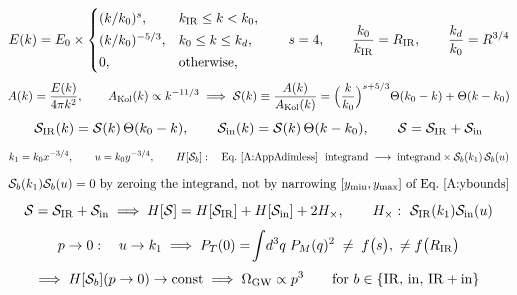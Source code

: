 \documentclass[10pt,prd,aps,nobibnotes,superscriptaddress,preprintnumbers,notitlepage]{revtex4-1}
\newcommand{\Omgw}{\Omega_{\rm GW}}
\begin{document}
\begin{equation}
  E(k)=E_0\times
  \begin{cases}
    (k/k_0)^{s}, & k_{\rm IR}\le k<k_0,\\[2pt]
    (k/k_0)^{-5/3}, & k_0\le k\le k_d,\\[2pt]
    0, & \text{otherwise,}
  \end{cases}
  \qquad s=4,
  \qquad \frac{k_0}{k_{\rm IR}}=R_{\rm IR},
  \qquad \frac{k_d}{k_0}=R^{3/4}
  \label{A:bs-input}
\end{equation}
\begin{equation}
  A(k)=\frac{E(k)}{4\pi k^2},
  \qquad
  A_{\rm Kol}(k)\propto k^{-11/3}
  \;\Longrightarrow\;
  \mathcal{S}(k)\equiv\frac{A(k)}{A_{\rm Kol}(k)}
  =\Bigl(\frac{k}{k_0}\Bigr)^{s+5/3}\Theta(k_0-k)+\Theta(k-k_0)
  \label{A:bs-shape}
\end{equation}
\begin{equation}
  \mathcal{S}_{\rm IR}(k)=\mathcal{S}(k)\,\Theta(k_0-k),
  \qquad
  \mathcal{S}_{\rm in}(k)=\mathcal{S}(k)\,\Theta(k-k_0),
  \qquad
  \mathcal{S}=\mathcal{S}_{\rm IR}+\mathcal{S}_{\rm in}
  \label{A:bs-masks}
\end{equation}
\begin{equation}
  k_1=k_0x^{-3/4},
  \qquad
  u=k_0y^{-3/4},
  \qquad
  H[\mathcal{S}_b]:\quad
  \text{Eq.~\eqref{A:AppAdimless}\ \ integrand}\;\longrightarrow\;
  \text{integrand}\times\mathcal{S}_b(k_1)\,\mathcal{S}_b(u)
  \label{A:bs-kernel}
\end{equation}
\begin{equation}
  \mathcal{S}_b(k_1)\mathcal{S}_b(u)=0
  \ \text{by zeroing the integrand, not by narrowing }[y_{\min},y_{\max}]\ \text{of Eq.~\eqref{A:ybounds}}
  \label{A:bs-mask-rule}
\end{equation}
\begin{equation}
  \mathcal{S}=\mathcal{S}_{\rm IR}+\mathcal{S}_{\rm in}
  \;\Longrightarrow\;
  H[\mathcal{S}]=H[\mathcal{S}_{\rm IR}]+H[\mathcal{S}_{\rm in}]+2H_\times,
  \qquad
  H_\times:\ \mathcal{S}_{\rm IR}(k_1)\mathcal{S}_{\rm in}(u)
  \label{A:bs-additivity}
\end{equation}
\begin{equation}
  p\to0:\quad u\to k_1
  \;\Longrightarrow\;
  P_T(0)=\!\int\!d^3q\;P_M(q)^2
  \;\ne\;f\bigl(s\bigr),\ \ne f\bigl(R_{\rm IR}\bigr)
  \label{A:bs-floor}
\end{equation}
\begin{equation}
  \Longrightarrow\;
  H[\mathcal{S}_b](p\to0)\to\text{const}
  \;\Longrightarrow\;
  \Omgw\propto p^3
  \qquad\text{for } b\in\{{\rm IR},\,{\rm in},\,{\rm IR}+{\rm in}\}
  \label{A:bs-causal}
\end{equation}
\end{document}
